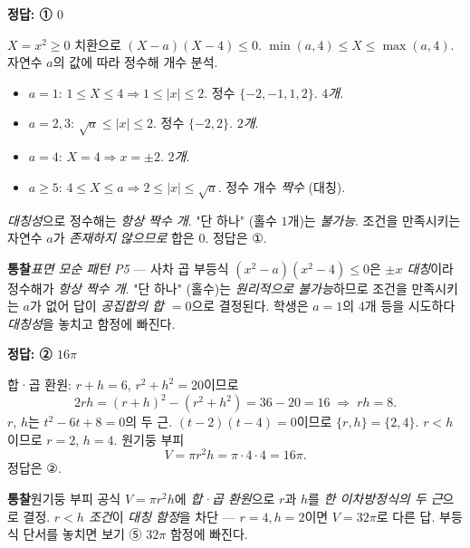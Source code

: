 \documentclass[10pt]{article}
\newcommand{\solnote}[1]{\par\smallskip\noindent
  \begin{tcolorbox}[enhanced, breakable, colback=vB-light, colframe=vB-light,
    boxrule=0pt, arc=3pt, left=10pt, right=10pt, top=4pt, bottom=4pt,
    fontupper=\sffamily\footnotesize\color{vB-ink}]
    \textbf{\color{vB-deep}통찰}\quad #1
  \end{tcolorbox}}
\begin{document}
\begin{answerbox}\sffamily\bfseries 정답: ① $0$\end{answerbox}
 $X = x^2 \ge 0$ 치환으로 $(X - a)(X - 4) \le 0$. $\min(a, 4) \le X \le \max(a, 4)$.
 자연수 $a$의 값에 따라 정수해 개수 분석.
\begin{itemize}\setlength{\itemsep}{0pt}
\item $a = 1$: $1 \le X \le 4 \Rightarrow 1 \le |x| \le 2$. 정수 $\{-2, -1, 1, 2\}$. \emph{$4$개}.
\item $a = 2, 3$: $\sqrt{a} \le |x| \le 2$. 정수 $\{-2, 2\}$. \emph{$2$개}.
\item $a = 4$: $X = 4 \Rightarrow x = \pm 2$. \emph{$2$개}.
\item $a \ge 5$: $4 \le X \le a \Rightarrow 2 \le |x| \le \sqrt{a}$. 정수 개수 \emph{짝수} (대칭).
\end{itemize}
 \emph{대칭성}으로 정수해는 \emph{항상 짝수 개}. "단 하나" (홀수 $1$개)는 \emph{불가능}.
 조건을 만족시키는 자연수 $a$가 \emph{존재하지 않으므로} 합은 $0$.
정답은 $\textbf{①}$.
\solnote{\emph{표면 모순 패턴 P5} — 사차 곱 부등식 $(x^2 - a)(x^2 - 4) \le 0$은 \emph{$\pm x$ 대칭}이라 정수해가 \emph{항상 짝수 개}. "단 하나" (홀수)는 \emph{원리적으로 불가능}하므로 조건을 만족시키는 $a$가 없어 답이 \emph{공집합의 합 $= 0$}으로 결정된다. 학생은 $a = 1$의 $4$개 등을 시도하다 \emph{대칭성}을 놓치고 함정에 빠진다.}

\begin{answerbox}\sffamily\bfseries 정답: ② $16\pi$\end{answerbox}
 합·곱 환원: $r + h = 6$, $r^2 + h^2 = 20$이므로
\[ 2rh = (r + h)^2 - (r^2 + h^2) = 36 - 20 = 16 \;\Longrightarrow\; rh = 8. \]
 $r$, $h$는 $t^2 - 6t + 8 = 0$의 두 근. $(t - 2)(t - 4) = 0$이므로 $\{r, h\} = \{2, 4\}$. $r < h$이므로 $r = 2$, $h = 4$.
 원기둥 부피
\[ V = \pi r^2 h = \pi \cdot 4 \cdot 4 = 16\pi. \]
 정답은 $\textbf{②}$.
\solnote{원기둥 부피 공식 $V = \pi r^2 h$에 \emph{합·곱 환원}으로 $r$과 $h$를 \emph{한 이차방정식의 두 근}으로 결정. \emph{$r < h$ 조건}이 \emph{대칭 함정}을 차단 — $r = 4, h = 2$이면 $V = 32\pi$로 다른 답. 부등식 단서를 놓치면 보기 ⑤ $32\pi$ 함정에 빠진다.}
\end{document}
